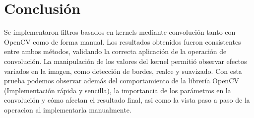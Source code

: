 \documentclass{iopjournal}
\begin{document}
\section{Conclusión}
Se implementaron filtros basados en kernels mediante convolución tanto con OpenCV como de forma manual. Los resultados obtenidos fueron 
consistentes entre ambos métodos, validando la correcta aplicación de la operación de convolución. La manipulación de los valores del 
kernel permitió observar efectos variados en la imagen, como detección de bordes, realce y suavizado. 
Con esta prueba podemos observar además del comportamiento de la librería OpenCV (Implementación rápida y sencilla), la importancia 
de los parámetros en la convolución y cómo afectan el resultado final, asi como la vista paso a paso de la operacion al implementarla manualmente.



%
\end{document}
